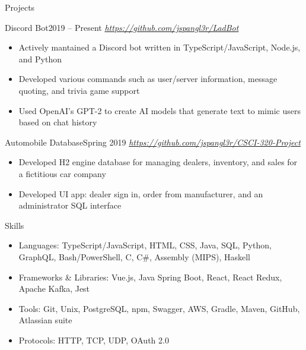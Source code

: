 \documentclass[]{mcdowellcv}
\begin{document}
	\begin{cvsection}{Projects}
		\begin{cvsubsection}{Discord Bot}{}{2019 -- Present}
			\textit{\url{https://github.com/jspangl3r/LadBot}}
			\begin{itemize}
				\item Actively mantained a Discord bot written in TypeScript/JavaScript, Node.js, and Python
				\item Developed various commands such as user/server information, message quoting, and trivia game support
				\item Used OpenAI's GPT-2 to create AI models that generate text to mimic users based on chat history
			\end{itemize}
		\end{cvsubsection}

		\begin{cvsubsection}{Automobile Database}{}{Spring 2019}
			\textit{\url{https://github.com/jspangl3r/CSCI-320-Project}}
			\begin{itemize}
				\item Developed H2 engine database for managing dealers, inventory, and sales for a fictitious car company
				\item Developed UI app: dealer sign in, order from manufacturer, and an administrator SQL interface
			\end{itemize}
		\end{cvsubsection}
	\end{cvsection}

	\begin{cvsection}{Skills}
		\begin{cvsubsection}{}{}{}	
			\begin{itemize}
				\item Languages: TypeScript/JavaScript, HTML, CSS, Java, SQL, Python, GraphQL, Bash/PowerShell, C, C\#, Assembly (MIPS), Haskell 
				\item Frameworks \& Libraries: Vue.js, Java Spring Boot, React, React Redux, Apache Kafka, Jest
				\item Tools: Git, Unix, PostgreSQL, npm, Swagger, AWS, Gradle, Maven, GitHub, Atlassian suite
				\item Protocols: HTTP, TCP, UDP, OAuth 2.0
			\end{itemize}
		\end{cvsubsection}
	\end{cvsection}
	
\end{document}
